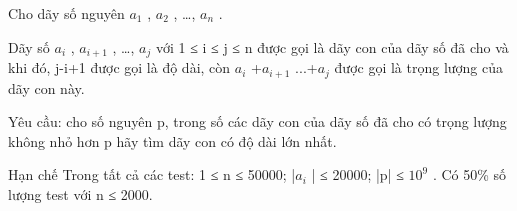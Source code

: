 Cho dãy số nguyên $a_{1}$   , $a_{2}$   , …, $a_{n}$   .  

   Dãy số $a_{i}$   , $a_{i+1}$   , …, $a_{j}$   với 1 ≤ i ≤ j ≤ n được gọi là dãy con của dãy số đã cho và khi đó, j-i+1 được gọi là độ dài, còn   $a_{i}$   +$a_{i+1}$   ...+$a_{j}$   được gọi là trọng lượng của dãy con này.  

   Yêu cầu: cho số nguyên p, trong số các dãy con của dãy số đã cho có trọng lượng không nhỏ hơn p hãy tìm dãy con có độ dài lớn nhất.  

Hạn chế
Trong tất cả các test: 1 ≤ n ≤ 50000;  |$a_{i}$   | ≤ 20000; |p| ≤ $10^{9}$   . Có 50\% số lượng test với n ≤ 2000.